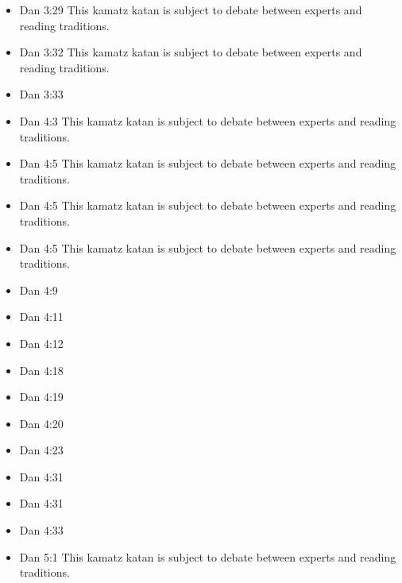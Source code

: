 \documentclass[14pt]{book}
\begin{document}
\begin{multicols}{2}
\begin{itemize}
\item Dan 3:29 This kamatz katan is subject to debate between experts and reading traditions.

\item Dan 3:32 This kamatz katan is subject to debate between experts and reading traditions.

\item Dan 3:33

\item Dan 4:3 This kamatz katan is subject to debate between experts and reading traditions.

\item Dan 4:5 This kamatz katan is subject to debate between experts and reading traditions.

\item Dan 4:5 This kamatz katan is subject to debate between experts and reading traditions.

\item Dan 4:5 This kamatz katan is subject to debate between experts and reading traditions.

\item Dan 4:9

\item Dan 4:11

\item Dan 4:12

\item Dan 4:18

\item Dan 4:19

\item Dan 4:20

\item Dan 4:23

\item Dan 4:31

\item Dan 4:31

\item Dan 4:33

\item Dan 5:1 This kamatz katan is subject to debate between experts and reading traditions.


\end{itemize}
\end{multicols}
\end{document}
